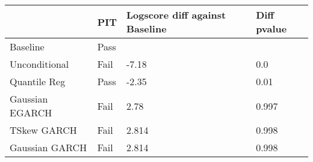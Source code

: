 \begin{tabular}{llll}
\toprule
{} &   PIT & Logscore diff against Baseline & Diff pvalue \\
\midrule
Baseline        &  Pass &                                &             \\
Unconditional   &  Fail &                          -7.18 &         0.0 \\
Quantile Reg    &  Pass &                          -2.35 &        0.01 \\
Gaussian EGARCH &  Fail &                           2.78 &       0.997 \\
TSkew GARCH     &  Fail &                          2.814 &       0.998 \\
Gaussian GARCH  &  Fail &                          2.814 &       0.998 \\
\bottomrule
\end{tabular}
